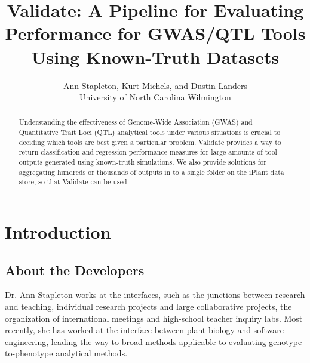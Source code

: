 \documentclass[twoside,a4paper]{refart}
\title{Validate: A Pipeline for Evaluating Performance for GWAS/QTL Tools Using Known-Truth Datasets}
\author{Ann Stapleton, Kurt Michels, and Dustin Landers \\
University of North Carolina Wilmington \\
}
\date{}
\begin{document}
\maketitle

\begin{abstract}
        Understanding the effectiveness of Genome-Wide Association (GWAS) and Quantitative Trait Loci (QTL) analytical tools under various situations is crucial to deciding which tools are best given a particular problem. Validate provides a way to return classification and regression performance measures for large amounts of tool outputs generated using known-truth simulations. We also provide solutions for aggregating hundreds or thousands of outputs in to a single folder on the iPlant data store, so that Validate can be used.\end{abstract}

\tableofcontents

\newpage



\begin{center}
\end{center}

\section{Introduction}

\subsection{About the Developers}

Dr. Ann Stapleton works at the interfaces, such as the junctions between research and teaching, individual research projects and large collaborative projects, the organization of international meetings and high-school teacher inquiry labs. Most recently, she has worked at the interface between plant biology and software engineering, leading the way to broad methods applicable to evaluating genotype-to-phenotype analytical methods.
\end{document}
